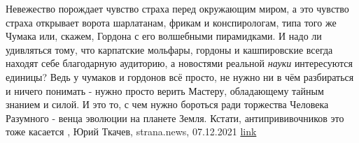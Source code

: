 Невежество порождает чувство страха перед окружающим миром, а это чувство
страха открывает ворота шарлатанам, фрикам и конспирологам, типа того же Чумака
или, скажем, Гордона с его волшебными пирамидками.  И надо ли удивляться тому,
что карпатские мольфары, гордоны и кашпировские всегда находят себе благодарную
аудиторию, а новостями реальной \emph{науки} интересуются единицы? Ведь у
чумаков и гордонов всё просто, не нужно ни в чём разбираться и ничего понимать
- нужно просто верить Мастеру, обладающему тайным знанием и силой.  И это то, с
чем нужно бороться ради торжества Человека Разумного - венца эволюции на
планете Земля.  Кстати, антипрививочников это тоже касается
, 
Юрий Ткачев, strana.news, 07.12.2021
\href{https://strana.news/opinions/365881-karpatskie-molfary-hordony-i-kashpirovskie-vsehda-nakhodjat-sebe-blahodarnuju-auditoriju.html}{link}
